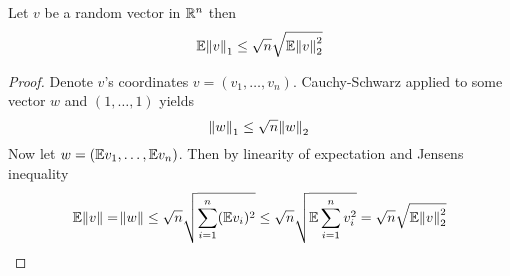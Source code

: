 


\begin{prop}
  \label{lem:norm12ineq}
  Let $v$ be a random vector in $\mathbb{R}^n$ then
  \[ \mathbb{E} \norm{v}_1 \leq \sqrt{n} \sqrt{ \mathbb{E} \norm{v}_2^2 } \]
\end{prop}

\begin{proof}
  Denote $v$'s coordinates $v=(v_1, \dots, v_n)$.
  Cauchy-Schwarz applied to some vector $w$ and $(1, \dots, 1)$ yields
  \[ \norm{w}_1 \leq \sqrt{n} \norm{w}_2 \]
  Now let $w = (\mathbb{E} v_1, \dots, \mathbb{E} v_n)$.
  Then by linearity of expectation and Jensens inequality
  \[ \mathbb{E} \norm{v} = \norm{w} \leq \sqrt{n} \sqrt{\sum_{i=1}^n (\mathbb{E} v_i)^2}
  \leq \sqrt{n} \sqrt{\mathbb{E} \sum_{i=1}^n v_i^2} = \sqrt{n} \sqrt{\mathbb{E} \norm{v}_2^2} \]
\end{proof}

